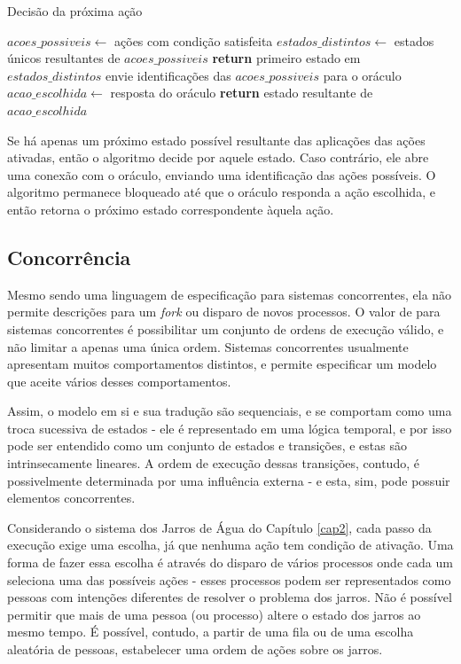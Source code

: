 \begin{algorithm}
\caption{Decisão da próxima ação}\label{alg:decide-action}
\begin{algorithmic}[1]
\State $acoes\_possiveis\gets$ ações com condição satisfeita
\State $estados\_distintos\gets$ estados únicos resultantes de $acoes\_possiveis$
\State \textbf{return} primeiro estado em $estados\_distintos$
\Else{}
\State envie identificações das $acoes\_possiveis$ para o oráculo
\State $acao\_escolhida\gets$ resposta do oráculo
\State \textbf{return} estado resultante de $acao\_escolhida$
\EndIf
\EndProcedure
\end{algorithmic}
\end{algorithm}

Se há apenas um próximo estado possível resultante das aplicações das ações
ativadas, então o algoritmo decide por aquele estado. Caso contrário, ele abre
uma conexão com o oráculo, enviando uma identificação das ações
possíveis. O algoritmo permanece bloqueado até que o oráculo responda a ação
escolhida, e então retorna o próximo estado correspondente àquela ação.


\subsection{Concorrência}

Mesmo \TLA sendo uma linguagem de especificação para sistemas concorrentes, ela
não permite descrições para um \textit{fork} ou disparo de novos
processos. O valor de \TLA para sistemas concorrentes é possibilitar um conjunto
de ordens de execução válido, e não limitar a apenas uma única ordem. Sistemas
concorrentes usualmente apresentam muitos comportamentos distintos, e \TLA
permite especificar um modelo que aceite vários desses comportamentos.

Assim, o modelo em si e sua tradução são sequenciais, e se comportam como uma troca
sucessiva de estados - ele é representado em uma lógica temporal, e por isso
pode ser entendido como um conjunto de estados e transições, e estas são
intrinsecamente lineares. A ordem de execução dessas transições, contudo, é
possivelmente determinada por uma influência externa - e esta, sim, pode possuir
elementos concorrentes.

Considerando o sistema dos Jarros de Água do Capítulo \ref{cap2}, cada passo da
execução exige uma escolha, já que nenhuma ação tem condição de ativação. Uma
forma de fazer essa escolha é através do disparo de vários processos onde cada
um seleciona uma das possíveis ações - esses processos podem ser representados
como pessoas com intenções diferentes de resolver o problema dos jarros. Não é
possível permitir que mais de uma pessoa (ou processo) altere o estado dos
jarros ao mesmo tempo. É possível, contudo, a partir de uma fila ou de uma
escolha aleatória de pessoas, estabelecer uma ordem de ações sobre os jarros.

